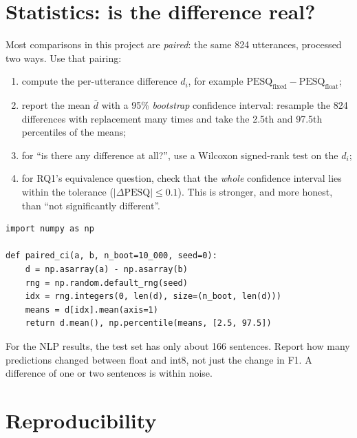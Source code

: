 \section{Statistics: is the difference real?}\label{sec:eval:stats}

Most comparisons in this project are \emph{paired}: the same 824 utterances,
processed two ways. Use that pairing:
\begin{enumerate}
  \item compute the per-utterance difference $d_i$, for example
        $\text{PESQ}_\text{fixed}-\text{PESQ}_\text{float}$;
  \item report the mean $\bar d$ with a 95\% \emph{bootstrap} confidence
        interval: resample the 824 differences with replacement many times and
        take the 2.5th and 97.5th percentiles of the means;
  \item for \enquote{is there any difference at all?}, use a Wilcoxon
        signed-rank test on the $d_i$;
  \item for RQ1's equivalence question, check that the \emph{whole} confidence
        interval lies within the tolerance ($|\Delta\text{PESQ}|\le0.1$). This is
        stronger, and more honest, than \enquote{not significantly different}.
\end{enumerate}

\begin{lstlisting}[style=py,caption={Paired bootstrap confidence interval for a mean difference.}]
import numpy as np

def paired_ci(a, b, n_boot=10_000, seed=0):
    d = np.asarray(a) - np.asarray(b)
    rng = np.random.default_rng(seed)
    idx = rng.integers(0, len(d), size=(n_boot, len(d)))
    means = d[idx].mean(axis=1)
    return d.mean(), np.percentile(means, [2.5, 97.5])
\end{lstlisting}

For the NLP results, the test set has only about 166 sentences. Report how many
predictions changed between float and int8, not just the change in F1. A
difference of one or two sentences is within noise.

\section{Reproducibility}\label{sec:eval:repro}

